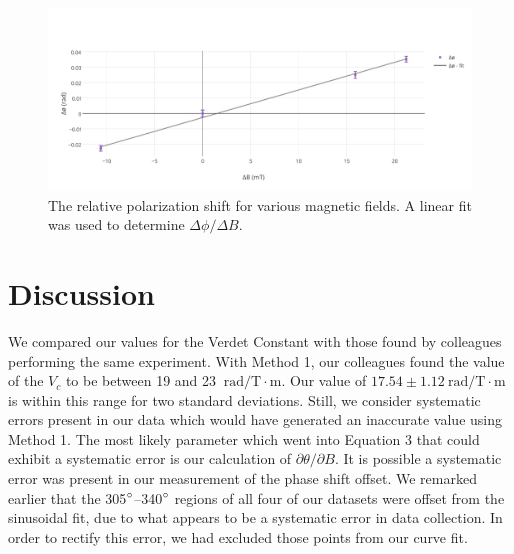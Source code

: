 \documentclass[prb,preprint]{revtex4-1}
\begin{document}
{{\begin{figure}
\includegraphics[width =6.3in]{verdet1.pdf}
\caption{\label{method2pic} The relative polarization shift for various magnetic fields. A linear fit was used to determine $\Delta \phi/\Delta B$.}
\end{figure}
}
\section{Discussion}

{We compared our values for the Verdet Constant with those found by colleagues performing the same experiment.  With Method 1, our colleagues found the value of the $V_{c}$ to be between 19 and 23 $\mathrm{~rad/T} \cdot \textrm{m}$.  Our value of $17.54 \pm 1.12 \mathrm{~rad/T} \cdot \textrm{m}$ is within this range for two standard deviations.  Still, we consider systematic errors present in our data which would have generated an inaccurate value using Method 1.  The most likely parameter which went into Equation 3 that could exhibit a systematic error is our calculation of $\partial \theta/\partial B$.  It is possible a systematic error was present in our measurement of the phase shift offset.  We remarked earlier that the 305$\degree$--340$\degree$ regions of all four of our datasets were offset from the sinusoidal fit, due to what appears to be a systematic error in data collection.  In order to rectify this error, we had excluded those points from our curve fit. 

}}
\end{document}
